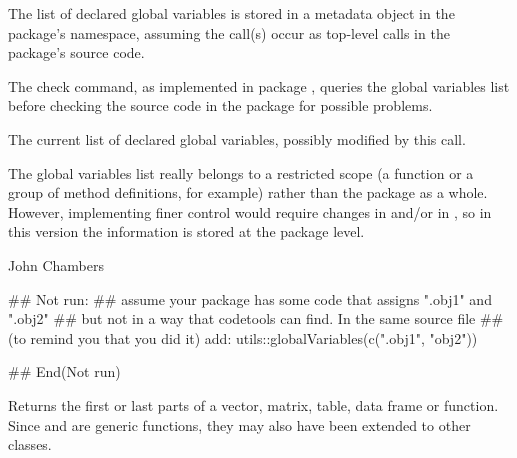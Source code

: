 %
\begin{Details}\relax
The list of declared global variables is stored in a metadata object
in the package's namespace, assuming the  call(s)
occur as top-level calls in the package's source code.

The check command, as implemented in package , queries the
global variables list before checking the \R{} source code in the
package for possible problems.
\end{Details}
%
\begin{Value}
The current list of declared global variables, possibly modified by
this call.
\end{Value}
%
\begin{Note}\relax
The global variables list really belongs to a restricted scope (a
function or a group of method definitions, for example) rather than the
package as a whole.  However, implementing finer control would require changes
in  and/or in , so in this version the
information is stored at the package level.
\end{Note}
%
\begin{Author}\relax
John Chambers
\end{Author}
%
\begin{Examples}
\begin{ExampleCode}
## Not run: 
## assume your package has some code that assigns ".obj1" and ".obj2"
## but not in a way that codetools can find.  In the same source file
## (to remind you that you did it) add:
utils::globalVariables(c(".obj1", "obj2"))

## End(Not run)
\end{ExampleCode}
\end{Examples}
%
\begin{Description}\relax
Returns the first or last parts of a vector, matrix, table, data frame
or function.  Since  and  are generic
functions, they may also have been extended to other classes.
\end{Description}
